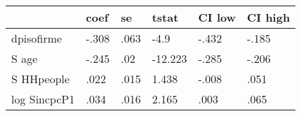 \begin{table}[htbp]
\begin{tabular}{llllll} \hline \hline
 & coef  & se  & tstat  & CI low  & CI high  \\  \hline 
dpisofirme & -.308 & .063 & -4.9 & -.432 & -.185 \\  
S age & -.245 & .02 & -12.223 & -.285 & -.206 \\  
S HHpeople & .022 & .015 & 1.438 & -.008 & .051 \\  
log SincpcP1 & .034 & .016 & 2.165 & .003 & .065 \\  
\hline \hline \end{tabular}
\end{table}
